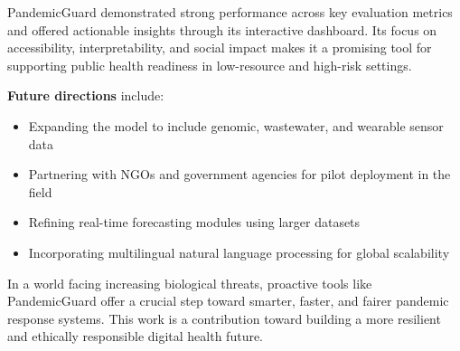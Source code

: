 \documentclass[11pt]{article}
\newcommand{\modelname}{PandemicGuard\xspace}
\begin{document}
\modelname demonstrated strong performance across key evaluation metrics and offered actionable insights through its interactive dashboard. Its focus on accessibility, interpretability, and social impact makes it a promising tool for supporting public health readiness in low-resource and high-risk settings.

\textbf{Future directions} include:

\begin{itemize}
    \item Expanding the model to include genomic, wastewater, and wearable sensor data
    \item Partnering with NGOs and government agencies for pilot deployment in the field
    \item Refining real-time forecasting modules using larger datasets
    \item Incorporating multilingual natural language processing for global scalability
\end{itemize}

In a world facing increasing biological threats, proactive tools like \modelname offer a crucial step toward smarter, faster, and fairer pandemic response systems. This work is a contribution toward building a more resilient and ethically responsible digital health future.



\end{document}

